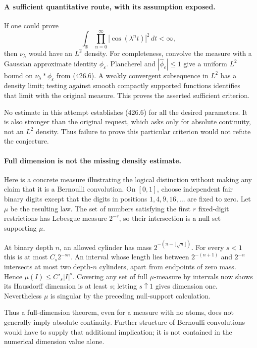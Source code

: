 \documentclass[11pt]{article}
\begin{document}
\paragraph{A sufficient quantitative route, with its assumption exposed.}
If one could prove
\[
 \int_{\mathbb R}\prod_{n=0}^{\infty}|\cos(\lambda^nt)|^2\,dt<\infty,
 \tag{426.6}
\]
then $\nu_\lambda$ would have an $L^2$ density. For completeness, convolve the measure with a Gaussian approximate identity $\phi_\varepsilon$. Plancherel and $|\widehat\phi_\varepsilon|\le1$ give a uniform $L^2$ bound on $\nu_\lambda*\phi_\varepsilon$ from (426.6). A weakly convergent subsequence in $L^2$ has a density limit; testing against smooth compactly supported functions identifies that limit with the original measure. This proves the asserted sufficient criterion.

No estimate in this attempt establishes (426.6) for all the desired parameters. It is also stronger than the original request, which asks only for absolute continuity, not an $L^2$ density. Thus failure to prove this particular criterion would not refute the conjecture.

\paragraph{Full dimension is not the missing density estimate.}
Here is a concrete measure illustrating the logical distinction without making any claim that it is a Bernoulli convolution. On $[0,1]$, choose independent fair binary digits except that the digits in positions $1,4,9,16,\ldots$ are fixed to zero. Let $\mu$ be the resulting law. The set of numbers satisfying the first $r$ fixed-digit restrictions has Lebesgue measure $2^{-r}$, so their intersection is a null set supporting $\mu$.

At binary depth $n$, an allowed cylinder has mass $2^{-(n-\lfloor\sqrt n\rfloor)}$. For every $s<1$ this is at most $C_s2^{-sn}$. An interval whose length lies between $2^{-(n+1)}$ and $2^{-n}$ intersects at most two depth-$n$ cylinders, apart from endpoints of zero mass. Hence $\mu(I)\le C'_s|I|^s$. Covering any set of full $\mu$-measure by intervals now shows its Hausdorff dimension is at least $s$; letting $s\uparrow1$ gives dimension one. Nevertheless $\mu$ is singular by the preceding null-support calculation.

Thus a full-dimension theorem, even for a measure with no atoms, does not generally imply absolute continuity. Further structure of Bernoulli convolutions would have to supply that additional implication; it is not contained in the numerical dimension value alone.
\end{document}
